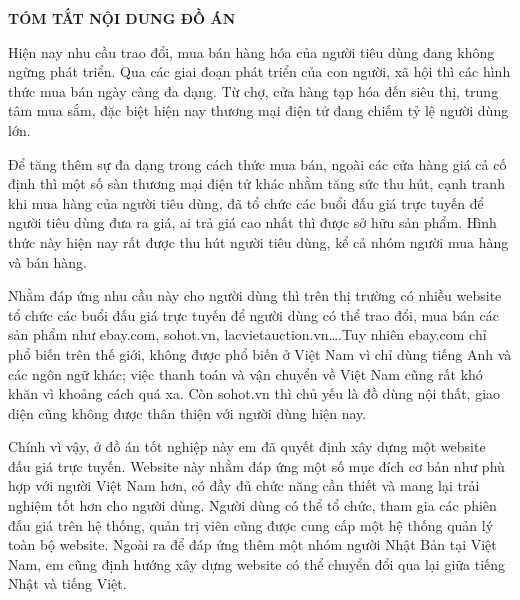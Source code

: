 \documentclass[../DoAn.tex]{subfiles}
\begin{document}
\begin{center}
    \Large{\textbf{TÓM TẮT NỘI DUNG ĐỒ ÁN}}\\
\end{center}
\vspace{1cm}
Hiện nay nhu cầu trao đổi, mua bán hàng hóa của người tiêu dùng đang không ngừng phát triển. Qua các giai đoạn phát triển của con người, xã hội thì các hình thức mua bán ngày càng đa dạng. Từ chợ, cửa hàng tạp hóa đến siêu thị, trung tâm mua sắm, đặc biệt hiện nay thương mại điện tử đang chiếm tỷ lệ người dùng lớn. 

Để tăng thêm sự đa dạng trong cách thức mua bán, ngoài các cửa hàng giá cả cố định thì một số sàn thương mại điện tử khác nhằm tăng sức thu hút, cạnh tranh khi mua hàng của người tiêu dùng, đã tổ chức các buổi đấu giá trực tuyến để người tiêu dùng đưa ra giá, ai trả giá cao nhất thì được sở hữu sản phẩm. Hình thức này hiện nay rất được thu hút người tiêu dùng, kể cả nhóm người mua hàng và bán hàng.

Nhằm đáp ứng nhu cầu này cho người dùng thì trên thị trường có nhiều website tổ chức các buổi đấu giá trực tuyến để người dùng có thể trao đổi, mua bán các sản phẩm như ebay.com, sohot.vn, lacvietauction.vn….Tuy nhiên ebay.com chỉ phổ biến trên thế giới, không được phổ biến ở Việt Nam vì chỉ dùng tiếng Anh và các ngôn ngữ khác; việc thanh toán và vận chuyển về Việt Nam cũng rất khó khăn vì khoảng cách quá xa. Còn sohot.vn thì chủ yếu là đồ dùng nội thất, giao diện cũng không được thân thiện với người dùng hiện nay.

Chính vì vậy, ở đồ án tốt nghiệp này em đã quyết định xây dựng một website đấu giá trực tuyến. Website này nhằm đáp ứng một số mục đích cơ bản như phù hợp với người Việt Nam hơn, có đầy đủ chức năng cần thiết và mang lại trải nghiệm tốt hơn cho người dùng. Người dùng có thể tổ chức, tham gia các phiên đấu giá trên hệ thống, quản trị viên cũng được cung cấp một hệ thống quản lý toàn bộ website. Ngoài ra để đáp ứng thêm một nhóm người Nhật Bản tại Việt Nam, em cũng định hướng xây dựng website có thể chuyển đổi  qua lại giữa tiếng Nhật và tiếng Việt.
\end{document}

